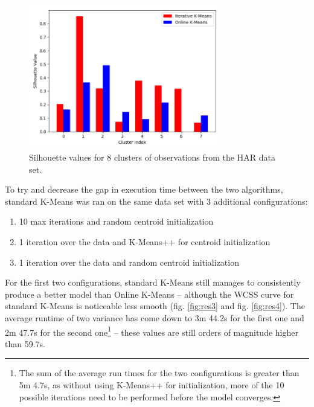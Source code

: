 \documentclass{l4proj}
\begin{document}
\begin{figure}[H]
	\centering
    \includegraphics[width=0.75\textwidth]{images/result19}
    \caption{Silhouette values for 8 clusters of observations from the HAR data set.} 
    \label{fig:res19}
\end{figure}

To try and decrease the gap in execution time between the two algorithms, standard K-Means was ran on the same data set with 3 additional configurations:

\begin{enumerate}
\item 10 max iterations and random centroid initialization
\item 1 iteration over the data and K-Means++ for centroid initialization
\item 1 iteration over the data and random centroid initialization
\end{enumerate}

For the first two configurations, standard K-Means still manages to consistently produce a better model than Online K-Means -- although the WCSS curve for standard K-Means is noticeable less smooth (fig. \ref{fig:res3} and fig. \ref{fig:res4}). The average runtime of two variance has come down to  3m 44.2s for the first one and 2m 47.7s for the second one\footnote{The sum of the average run times for the two configurations is greater than 5m 4.7s, as without using K-Means++ for initialization, more of the 10 possible iterations need to be performed before the model converges.} -- these values are still orders of magnitude higher than 59.7s.
\end{document}
